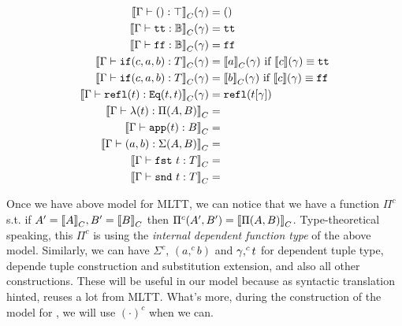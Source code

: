 \begin{align*}
  {{\llbracket {\ensuremath{ {\Gamma} \vdash {\ensuremath{()}} : {\top} }} \rrbracket}_C}(\gamma) &= ()\\
  {{\llbracket {\ensuremath{ {\Gamma} \vdash {\ensuremath{\texttt{tt}}} : {\mathbb{B}} }} \rrbracket}_C}(\gamma) &= \texttt{tt} \\
  {{\llbracket {\ensuremath{ {\Gamma} \vdash {\ensuremath{\texttt{ff}}} : {\mathbb{B}} }} \rrbracket}_C}(\gamma) &= \texttt{ff} \\
  {{\llbracket {\ensuremath{ {\Gamma} \vdash {\ensuremath{\texttt{if}({c},{a},{b})}} : {T} }} \rrbracket}_C}(\gamma) &= {{\llbracket {a} \rrbracket}_C}(\gamma) \text{ if } \llbracket {c} \rrbracket(\gamma) \equiv \texttt{tt} \\
  {{\llbracket {\ensuremath{ {\Gamma} \vdash {\ensuremath{\texttt{if}({c},{a},{b})}} : {T} }} \rrbracket}_C}(\gamma) &= {{\llbracket {b} \rrbracket}_C}(\gamma) \text{ if } \llbracket {c} \rrbracket(\gamma) \equiv \texttt{ff} \\
  {{\llbracket {\ensuremath{ {\Gamma} \vdash {\ensuremath{\texttt{refl}({t})}} : {\texttt{Eq}({t},{t})} }} \rrbracket}_C}(\gamma) &= \texttt{refl}({{t}\!\left[{\gamma}\right]})\\
  {{\llbracket {\ensuremath{ {\Gamma} \vdash {\ensuremath{\lambda({t})}} : {\Pi({A},{B})} }} \rrbracket}_C} &= \\
  {{\llbracket {\ensuremath{ {\Gamma} \vdash {\ensuremath{\texttt{app}({t})}} : {B} }} \rrbracket}_C} &= \\
  {{\llbracket {\ensuremath{ {\Gamma} \vdash {\ensuremath{({a},{b})}} : {\Sigma({A},{B})} }} \rrbracket}_C} &= \\
  {{\llbracket {\ensuremath{ {\Gamma} \vdash {\ensuremath{\texttt{fst}~{t}}} : {T} }} \rrbracket}_C} &= \\
  {{\llbracket {\ensuremath{ {\Gamma} \vdash {\ensuremath{\texttt{snd}~{t}}} : {T} }} \rrbracket}_C} &= \\
\end{align*}

\newcommand{\Glued}[1]{\ensuremath{{#1}^c}}
\newcommand{\GluedPi}[2]{\ensuremath{\Pi^c({#1},{#2})}}
\newcommand{\GSubstExt}[2]{\ensuremath{{#1},^c{#2}}}
\newcommand{\Gpair}[2]{\ensuremath{({#1},^c{#2})}}
\newcommand{\Gfst}[1]{\ensuremath{\texttt{fst}^c~{#1}}}
\newcommand{\Gsnd}[1]{\ensuremath{\texttt{snd}^c~{#1}}}
\newcommand{\Gsub}[2]{\ensuremath{{#1}\!\left[{#2}\right]^c}}
\newcommand{\Gapp}[1]{\ensuremath{\texttt{app}^c({#1})}}
\newcommand{\GSubstWeak}[1]{\ensuremath{(\texttt{p}^c)^{#1}}}
\newcommand{\GLSigAdd}[3]{\ensuremath{\nu^{+c}({#1},{#2},{#3})}}
\newcommand{\GCaseSig}[3]{\ensuremath{\texttt{CaseTy}^c({#1},{#2},{#3})}}

Once we have above model for MLTT, we can notice that we have a function $\Glued{\Pi}$ s.t. if $A' = {{\llbracket {A} \rrbracket}_C}, B' = {{\llbracket {B} \rrbracket}_C}$ then $\GluedPi{A'}{B'} = \denotesC{\TyPi{A}{B}}$. Type-theoretical speaking, this $\Glued{\Pi}$ is using the \emph{internal dependent function type} of the above model. Similarly, we can have $\Glued{\Sigma}$, $\Gpair{a}{b}$  and $\GSubstExt{\gm}{t}$  for dependent tuple type, depende tuple construction and substitution extension, and also all other constructions. These will be useful in our \TT model because as syntactic translation hinted, \TT reuses a lot from MLTT. What's more, during the construction of the model for \TT, we will use $\Glued{(\cdot)}$ when we can.

